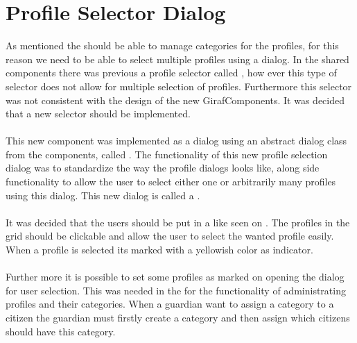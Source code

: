 
\section{Profile Selector Dialog}
\label{sec:profile_selector_dialog}

As mentioned the \ct should be able to manage categories for the profiles, for this reason we need to be able to select multiple profiles using a dialog. In the shared components there was previous a profile selector called , how ever this type of selector does not allow for multiple selection of profiles. Furthermore this selector was not consistent with the design of the new GirafComponents. It was decided that a new selector should be implemented. 
\\\\
This new component was implemented as a dialog using an abstract dialog class from the components, called . The functionality of this new profile selection dialog was to standardize the way the profile dialogs looks like, along side functionality to allow the user to select either one or arbitrarily many profiles using this dialog. This new dialog is called a .
\\\\
It was decided that the users should be put in a  like seen on . The profiles in the grid should be clickable and allow the user to select the wanted profile easily. When a profile is selected its marked with a yellowish color as indicator.
\\\\
Further more it is possible to set some profiles as marked on opening the dialog for user selection. This was needed in the \ct for the functionality of administrating profiles and their categories. When a guardian want to assign a category to a citizen the guardian must firstly create a category and then assign which citizens should have this category.